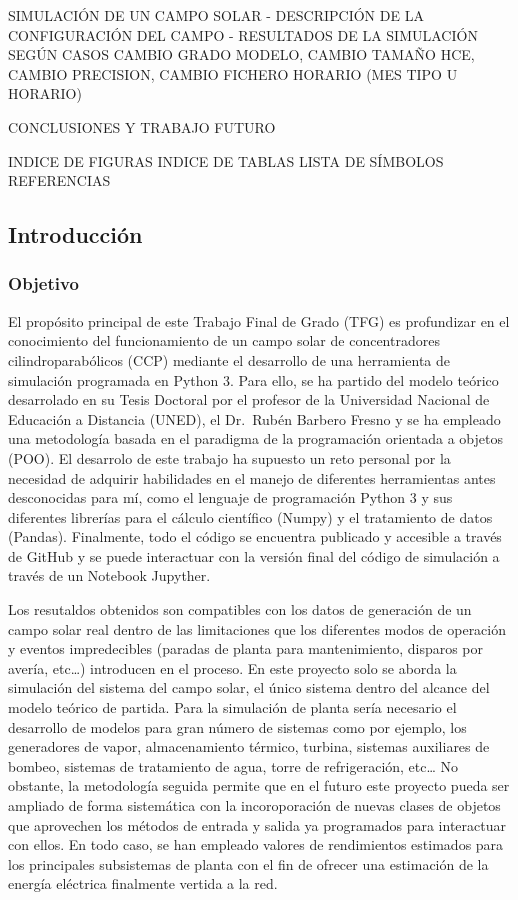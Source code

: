 \documentclass[11pt]{article}
\begin{document}
SIMULACIÓN DE UN CAMPO SOLAR - DESCRIPCIÓN DE LA CONFIGURACIÓN DEL CAMPO
- RESULTADOS DE LA SIMULACIÓN SEGÚN CASOS CAMBIO GRADO MODELO, CAMBIO
TAMAÑO HCE, CAMBIO PRECISION, CAMBIO FICHERO HORARIO (MES TIPO U
HORARIO)

CONCLUSIONES Y TRABAJO FUTURO

INDICE DE FIGURAS INDICE DE TABLAS LISTA DE SÍMBOLOS REFERENCIAS

\hypertarget{introducciuxf3n}{%
\subsection{Introducción}\label{introducciuxf3n}}

\hypertarget{objetivo}{%
\subsubsection{Objetivo}\label{objetivo}}

El propósito principal de este Trabajo Final de Grado (TFG) es
profundizar en el conocimiento del funcionamiento de un campo solar de
concentradores cilindroparabólicos (CCP) mediante el desarrollo de una
herramienta de simulación programada en Python 3. Para ello, se ha
partido del modelo teórico desarrolado en su Tesis Doctoral por el
profesor de la Universidad Nacional de Educación a Distancia (UNED), el
Dr.~Rubén Barbero Fresno y se ha empleado una metodología basada en el
paradigma de la programación orientada a objetos (POO). El desarrolo de
este trabajo ha supuesto un reto personal por la necesidad de adquirir
habilidades en el manejo de diferentes herramientas antes desconocidas
para mí, como el lenguaje de programación Python 3 y sus diferentes
librerías para el cálculo científico (Numpy) y el tratamiento de datos
(Pandas). Finalmente, todo el código se encuentra publicado y accesible
a través de GitHub y se puede interactuar con la versión final del
código de simulación a través de un Notebook Jupyther.

Los resutaldos obtenidos son compatibles con los datos de generación de
un campo solar real dentro de las limitaciones que los diferentes modos
de operación y eventos impredecibles (paradas de planta para
mantenimiento, disparos por avería, etc\ldots{}) introducen en el
proceso. En este proyecto solo se aborda la simulación del sistema del
campo solar, el único sistema dentro del alcance del modelo teórico de
partida. Para la simulación de planta sería necesario el desarrollo de
modelos para gran número de sistemas como por ejemplo, los generadores
de vapor, almacenamiento térmico, turbina, sistemas auxiliares de
bombeo, sistemas de tratamiento de agua, torre de refrigeración,
etc\ldots{} No obstante, la metodología seguida permite que en el futuro
este proyecto pueda ser ampliado de forma sistemática con la
incoroporación de nuevas clases de objetos que aprovechen los métodos de
entrada y salida ya programados para interactuar con ellos. En todo
caso, se han empleado valores de rendimientos estimados para los
principales subsistemas de planta con el fin de ofrecer una estimación
de la energía eléctrica finalmente vertida a la red.
\end{document}
